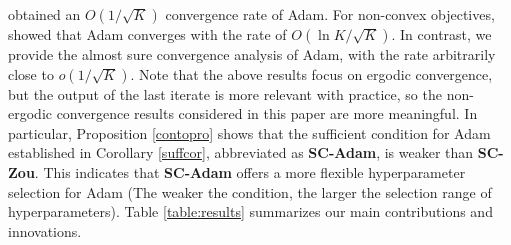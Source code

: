 \documentclass[twoside,11pt]{article}
\begin{document}
\citet{kingma2014adam,reddi2019convergence} obtained an $O(1/\sqrt{K})$ convergence rate of Adam. For non-convex objectives,  \citet{zou2019sufficient,chen2019convergence,guo2021novel,defossezsimple,zhang2022adam} showed that Adam converges with the rate of $O(\ln K/\sqrt{K})$. In contrast, we provide the almost sure convergence analysis of Adam, with the rate arbitrarily close to $o(1/\sqrt{K})$. Note that the above results focus on ergodic convergence, but the output of the last iterate is more relevant with practice, so the non-ergodic convergence results considered in this paper are more meaningful. In particular, Proposition \ref{contopro} shows that the sufficient condition for Adam established in Corollary \ref{suffcor}, abbreviated as \textbf{SC-Adam}, is  weaker than \textbf{SC-Zou}. This indicates that \textbf{SC-Adam} offers a more flexible hyperparameter selection for Adam (The weaker the condition, the larger the selection range of hyperparameters). Table \ref{table:results} summarizes our main contributions and innovations.


\begin{table}[h]
\renewcommand{\arraystretch}{1.2}
\tabcolsep=0.5mm
\centering
{}
\caption{Comparison with previous works.}
\label{table:results}
\end{table}
\end{document}
